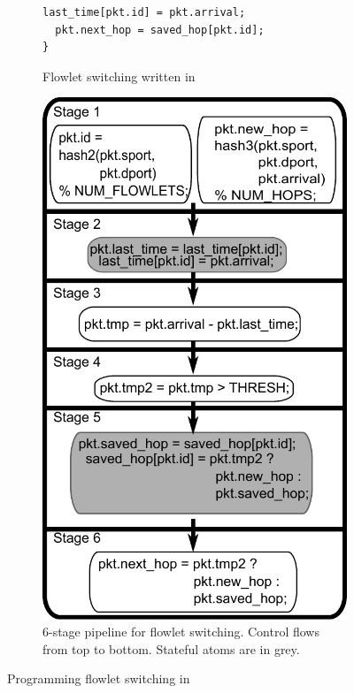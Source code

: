 \begin{figure}[!t]
\begin{subfigure}{0.5\textwidth}
\begin{small}
\begin{lstlisting}[style=customc]
  last_time[pkt.id] = pkt.arrival;
  pkt.next_hop = saved_hop[pkt.id];
}
\end{lstlisting}
\end{small}
\caption{Flowlet switching written in \pktlanguage}
\label{fig:flowlet_code}
\end{subfigure}
%
%
\begin{subfigure}{0.4\textwidth}
\includegraphics[width=0.9\columnwidth]{pipe.pdf}
\caption{6-stage \absmachine pipeline for flowlet
switching.  Control flows from top to bottom. Stateful atoms are in grey.}
\label{fig:flowlet_pipeline}
\end{subfigure}
\caption{Programming flowlet switching in \pktlanguage}
\end{figure}

